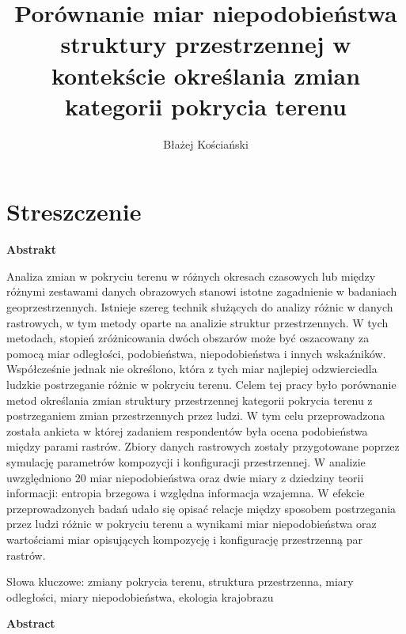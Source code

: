 \documentclass{amuthesis}
\author{Błażej Kościański}
\title{Porównanie miar niepodobieństwa struktury przestrzennej w
kontekście określania zmian kategorii pokrycia terenu}
\begin{document}

\titlepage


\hypertarget{streszczenie}{%
\chapter*{Streszczenie}\label{streszczenie}}


\textbf{Abstrakt}

Analiza zmian w pokryciu terenu w różnych okresach czasowych lub między
różnymi zestawami danych obrazowych stanowi istotne zagadnienie w
badaniach geoprzestrzennych. Istnieje szereg technik służących do
analizy różnic w danych rastrowych, w tym metody oparte na analizie
struktur przestrzennych. W tych metodach, stopień zróżnicowania dwóch
obszarów może być oszacowany za pomocą miar odległości, podobieństwa,
niepodobieństwa i innych wskaźników. Współcześnie jednak nie określono,
która z tych miar najlepiej odzwierciedla ludzkie postrzeganie różnic w
pokryciu terenu. Celem tej pracy było porównanie metod określania zmian
struktury przestrzennej kategorii pokrycia terenu z postrzeganiem zmian
przestrzennych przez ludzi. W tym celu przeprowadzona została ankieta w
której zadaniem respondentów była ocena podobieństwa między parami
rastrów. Zbiory danych rastrowych zostały przygotowane poprzez symulację
parametrów kompozycji i konfiguracji przestrzennej. W analizie
uwzględniono 20 miar niepodobieństwa oraz dwie miary z dziedziny teorii
informacji: entropia brzegowa i względna informacja wzajemna. W efekcie
przeprowadzonych badań udało się opisać relacje między sposobem
postrzegania przez ludzi różnic w pokryciu terenu a wynikami miar
niepodobieństwa oraz wartościami miar opisujących kompozycję i
konfigurację przestrzenną par rastrów.

Słowa kluczowe: zmiany pokrycia terenu, struktura przestrzenna, miary
odległości, miary niepodobieństwa, ekologia krajobrazu

\newpage

\textbf{Abstract}
\end{document}
